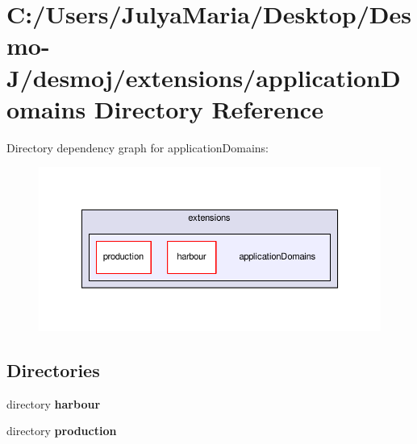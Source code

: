 \section{C\-:/\-Users/\-Julya\-Maria/\-Desktop/\-Desmo-\/\-J/desmoj/extensions/application\-Domains Directory Reference}
\label{dir_8f472bdb1a3461f79967e5d4e8e35d98}
Directory dependency graph for application\-Domains\-:
\nopagebreak
\begin{figure}[H]
\begin{center}
\leavevmode
\includegraphics[width=350pt]{dir_8f472bdb1a3461f79967e5d4e8e35d98_dep}
\end{center}
\end{figure}
\subsection*{Directories}
\begin{DoxyCompactItemize}
\item 
directory {\bf harbour}
\item 
directory {\bf production}
\end{DoxyCompactItemize}
